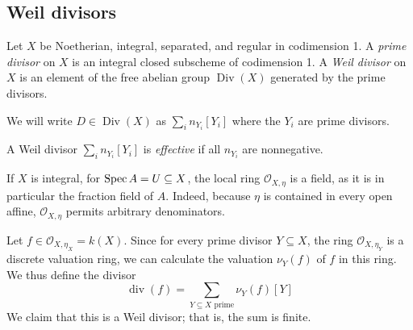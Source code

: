 \subsection{Weil divisors}
\begin{definition}
    Let \( X \) be Noetherian, integral, separated, and regular in codimension 1.
    A \emph{prime divisor} on \( X \) is an integral closed subscheme of codimension 1.
    A \emph{Weil divisor} on \( X \) is an element of the free abelian group \( \operatorname{Div}(X) \) generated by the prime divisors.
\end{definition}
We will write \( D \in \operatorname{Div}(X) \) as \( \sum_i n_{Y_i} [Y_i] \) where the \( Y_i \) are prime divisors.
\begin{definition}
    A Weil divisor \( \sum_i n_{Y_i} [Y_i] \) is \emph{effective} if all \( n_{Y_i} \) are nonnegative.
\end{definition}
If \( X \) is integral, for \( \operatorname{Spec} A = U \subseteq X \), the local ring \( \mathcal O_{X, \eta} \) is a field, as it is in particular the fraction field of \( A \).
Indeed, because \( \eta \) is contained in every open affine, \( \mathcal O_{X, \eta} \) permits arbitrary denominators.

Let \( f \in \mathcal O_{X, \eta_X} = k(X) \).
Since for every prime divisor \( Y \subseteq X \), the ring \( \mathcal O_{X, \eta_Y} \) is a discrete valuation ring, we can calculate the valuation \( \nu_Y(f) \) of \( f \) in this ring.
We thus define the divisor
\[ \operatorname{div}(f) = \sum_{Y \subseteq X \text{ prime}} \nu_Y(f) [Y] \]
We claim that this is a Weil divisor; that is, the sum is finite.
